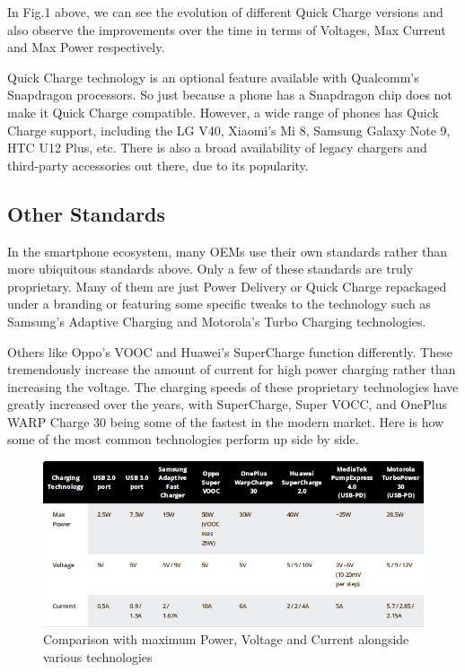 \documentclass[conference]{IEEEtran}
\begin{document}
In Fig.1 above, we can see the evolution of different Quick Charge versions and also observe the improvements over the time in terms of Voltages, Max Current and Max Power respectively.

Quick Charge technology is an optional feature available with Qualcomm's Snapdragon processors. So just because a phone has a Snapdragon chip does not make it Quick Charge compatible. However, a wide range of phones has Quick Charge support, including the LG V40, Xiaomi's Mi 8, Samsung Galaxy Note 9, HTC U12 Plus, etc. There is also a broad availability of legacy chargers and third-party accessories out there, due to its popularity.

\subsection{Other Standards}

In the smartphone ecosystem, many OEMs use their own standards rather than more ubiquitous standards above. Only a few of these standards are truly proprietary. Many of them are just Power Delivery or Quick Charge repackaged under a branding or featuring some specific tweaks to the technology such as Samsung’s Adaptive Charging and Motorola’s Turbo Charging technologies.

Others like Oppo's VOOC and Huawei's SuperCharge function differently. These tremendously increase the amount of current for high power charging rather than increasing the voltage. The charging speeds of these proprietary technologies have greatly increased over the years, with SuperCharge, Super VOCC, and OnePlus WARP Charge 30 being some of the fastest in the modern market. Here is how some of the most common technologies perform up side by side. 

\begin{figure}[h!]
  \includegraphics[width=\linewidth]{images/image2.png}
  \caption{Comparison with maximum Power, Voltage and Current alongside various technologies\cite{b13}}
\end{figure}
\end{document}
